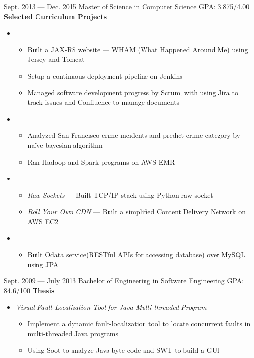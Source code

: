 \documentclass{resume}
\begin{document}
\begin{body}
	{Sept. 2013 --- Dec. 2015}
	{Master of Science in Computer Science}
	{GPA: 3.875/4.00}
	\textbf{Selected Curriculum Projects}
	\begin{itemize}
	\item {}
	\begin{itemize}
		\item Built a JAX-RS website --- WHAM (What Happened Around Me) using Jersey and Tomcat
		\item Setup a continuous deployment pipeline on Jenkins
		\item Managed software development progress by Scrum, with using Jira to track issues and Confluence to manage documents
	\end{itemize}

	\item {}
	\begin{itemize}
		\item Analyzed San Francisco crime incidents and predict crime category by na\"{i}ve bayesian algorithm
		\item Ran Hadoop and Spark programs on AWS EMR
	\end{itemize}

	\item {}
	\begin{itemize}
		\item \textit{Raw Sockets} --- Built TCP/IP stack using Python raw socket
		\item \textit{Roll Your Own CDN} --- Built a simplified Content Delivery Network on AWS EC2
	\end{itemize}

	\item {}
	\begin{itemize}
		\item Built Odata service(RESTful APIs for accessing database) over MySQL using JPA
	\end{itemize}

	\end{itemize}
\end{body}

\begin{body}
	{Sept. 2009 --- July 2013}
	{Bachelor of Engineering in Software Engineering}
	{GPA: 84.6/100}
	\textbf{Thesis}
	\begin{itemize}
	\item \textit{Visual Fault Localization Tool for Java Multi-threaded Program}
	\begin{itemize}
		\item Implement a dynamic fault-localization tool to locate concurrent faults in multi-threaded Java programs
		\item Using Soot to analyze Java byte code and SWT to build a GUI
	\end{itemize}
	\end{itemize}
\end{body}
\end{document}
